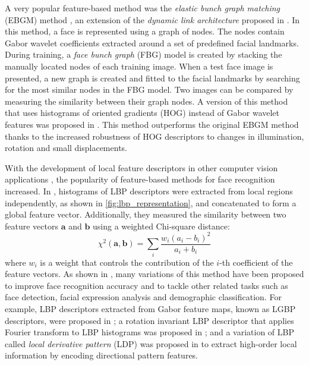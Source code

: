 \documentclass[conference]{IEEEtran}
\begin{document}
A very popular feature-based method was the \textit{elastic bunch graph matching} (EBGM) method \cite{wiskott1997face}, an extension of the \textit{dynamic link architecture} proposed in \cite{lades1993distortion}. In this method, a face is represented using a graph of nodes. The nodes contain Gabor wavelet coefficients \cite{lee1996image} extracted around a set of predefined facial landmarks. During training, a \textit{face bunch graph} (FBG) model is created by stacking the manually located nodes of each training image. When a test face image is presented, a new graph is created and fitted to the facial landmarks by searching for the most similar nodes in the FBG model. Two images can be compared by measuring the similarity between their graph nodes. A version of this method that uses histograms of oriented gradients (HOG) \cite{freeman1995orientation,dalal2005histograms} instead of Gabor wavelet features was proposed in \cite{albiol2008face}. This method outperforms the original EBGM method thanks to the increased robustness of HOG descriptors to changes in illumination, rotation and small displacements.

With the development of local feature descriptors in other computer vision applications \cite{mikolajczyk2005performance}, the popularity of feature-based methods for face recognition increased. In \cite{ahonen2006face}, histograms of LBP descriptors were extracted from local regions independently, as shown in \cref{fig:lbp_representation}, and concatenated to form a global feature vector. Additionally, they measured the similarity between two feature vectors $\bm{a}$ and $\bm{b}$ using a weighted Chi-square distance:
\begin{equation}
    \chi^2(\bm{a}, \bm{b}) = \sum_i{\frac{w_i(a_i-b_i)^2}{a_i+b_i}}
    \label{eq:chi_square_distance}
\end{equation}
where $w_i$ is a weight that controls the contribution of the $i$-th coefficient of the feature vectors. As shown in \cite{huang2011local}, many variations of this method have been proposed to improve face recognition accuracy and to tackle other related tasks such as face detection, facial expression analysis and demographic classification. For example, LBP descriptors extracted from Gabor feature maps, known as LGBP descriptors, were proposed in \cite{zhang2005multi,zhang2005local}; a rotation invariant LBP descriptor that applies Fourier transform to LBP histograms was proposed in \cite{ahonen2009rotation}; and a variation of LBP called \textit{local derivative pattern} (LDP) was proposed in \cite{zhang2010local} to extract high-order local information by encoding directional pattern features.
\end{document}
